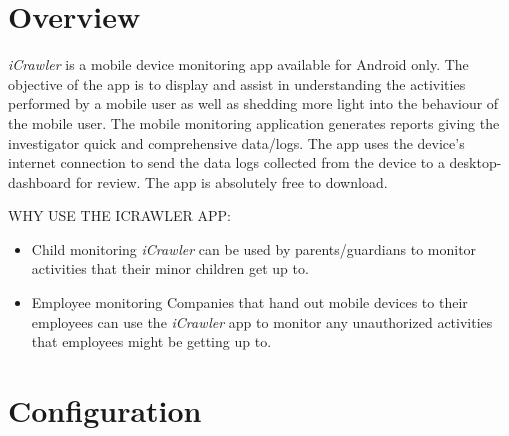 \documentclass[hidelinks, 12pt, oneside]{article}
\begin{document}
	
	\tableofcontents
	\newpage
	
	\section{Overview}
	\emph{iCrawler} is a mobile device monitoring app available for Android only. The objective of the app is to display and assist in understanding the activities performed by a mobile user as well as shedding more light into the behaviour of the mobile user. The mobile monitoring application generates reports giving the investigator quick and comprehensive data/logs. The app
uses the device's internet connection to send the data logs collected from the device to a desktop-dashboard for review. The app is absolutely free to download.\newline\newline
	 
	 \uppercase{Why use the \MakeLowercase iCrawler App:}\newline
	 \begin{itemize}
		\item Child monitoring\newline
		\emph{iCrawler} can be used by parents/guardians to monitor activities that their minor
		 children get up to.	
		\item Employee monitoring\newline
		Companies that hand out mobile devices to their employees can use the \emph{iCrawler} app to monitor any 
		unauthorized activities that employees might be getting up to.
	\end{itemize}
	\newpage
	
	
	\section{Configuration}
	
\end{document}
